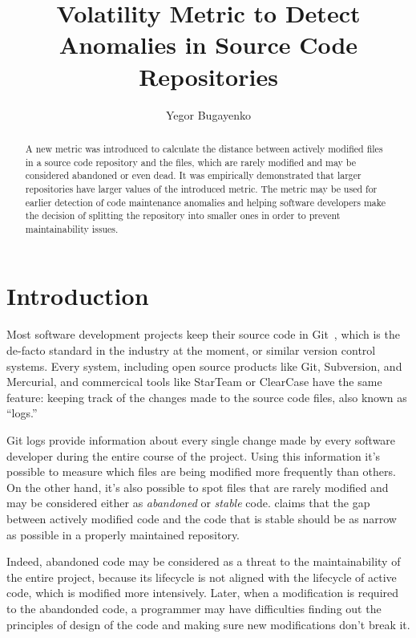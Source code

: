 \documentclass[sigplan,10pt,screen]{acmart}
\title{Volatility Metric to Detect Anomalies in Source Code Repositories}
\author{Yegor Bugayenko}
\affiliation{\institution{}\city{Moscow}\country{Russia}}
\begin{document}
\begin{abstract}
A new metric was introduced to calculate the distance
between actively modified files in a source code repository
and the files, which are rarely modified and may be considered
abandoned or even dead. It was empirically demonstrated that larger repositories
have larger values of the introduced metric.
The metric may be used for earlier detection of code maintenance anomalies
and helping software developers make the decision of splitting the repository
into smaller ones in order to prevent maintainability issues.
\end{abstract}
\maketitle

\section{Introduction}

Most software development projects keep their source code in Git~\citep{loeliger2012},
which is the de-facto standard in the industry at the moment, or similar
version control systems. Every system, including open
source products like Git, Subversion, and Mercurial, and commercical tools
like StarTeam\texttrademark{} or ClearCase\texttrademark{}
have the same feature: keeping track of the changes
made to the source code files, also known as ``logs.''

Git logs provide information about every single change made by every software
developer during the entire course of the project. Using this information
it's possible to measure which files are being modified more frequently than others.
On the other hand, it's also possible to spot files that are rarely modified and may
be considered either as \emph{abandoned} or \emph{stable} code.
\citet{fontana2014} claims that the gap between actively modified code
and the code that is stable should be as narrow as possible in a properly
maintained repository.

Indeed, abandoned code may be considered as a threat
to the maintainability of the entire project, because its lifecycle
is not aligned with the lifecycle of active code, which is modified more intensively.
Later, when a modification is required to the abandonded code, a programmer
may have difficulties finding out the principles of design of the code and
making sure new modifications don't break it.
\end{document}
